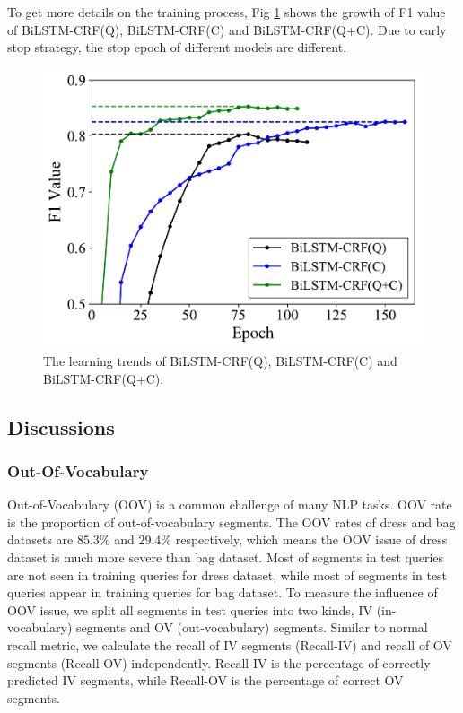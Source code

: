 To get more details on the training process, Fig \ref{fig:curve} shows the growth of F1 value of BiLSTM-CRF(Q), BiLSTM-CRF(C) and BiLSTM-CRF(Q+C). Due to early stop strategy, the stop epoch of different models are different.

\begin{figure}[th]
	\centering
	\includegraphics[width=0.7\columnwidth]{figures/result-1.pdf}
	\caption{The learning trends of BiLSTM-CRF(Q), BiLSTM-CRF(C) and BiLSTM-CRF(Q+C).}
	\label{fig:curve}
\end{figure}


\subsection{Discussions}

\subsubsection{Out-Of-Vocabulary}
\label{sec:oov}

Out-of-Vocabulary (OOV) is a common challenge of many NLP tasks. OOV rate is the proportion of out-of-vocabulary segments. The OOV rates of dress and bag datasets are $85.3\%$ and $29.4\%$ respectively, which means the OOV issue of dress dataset is much more severe than bag dataset. Most of segments in test queries are not seen in training queries for dress dataset, while most of segments in test queries appear in training queries for bag dataset. To measure the influence of OOV issue, we split all segments in test queries into two kinds, IV (in-vocabulary) segments and OV (out-vocabulary) segments. Similar to normal recall metric, we calculate the recall of IV segments (Recall-IV) and recall of OV segments (Recall-OV) independently. Recall-IV is the percentage of correctly predicted IV segments, while Recall-OV is the percentage of correct OV segments.


